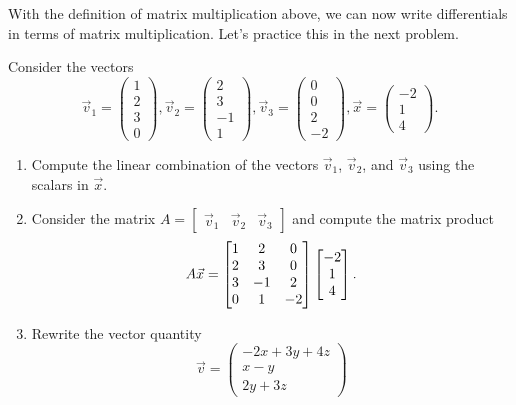 With the definition of matrix multiplication above, we can now write differentials in terms of matrix multiplication. Let's practice this in the next problem.
\begin{problem}
Consider the vectors 
$$
\vec v_1 = 
\begin{pmatrix}
 1\\2\\3\\0
\end{pmatrix},
 \vec v_2 = 
\begin{pmatrix}
 2\\3\\-1\\1
\end{pmatrix},
\vec v_3 = 
\begin{pmatrix}
 0\\0\\2\\-2
\end{pmatrix},
\vec x = 
\begin{pmatrix}
 -2\\1\\4
\end{pmatrix}.
$$
\begin{enumerate}
 \item Compute the linear combination of the vectors $\vec v_1$, $\vec v_2$, and $\vec v_3$ using the scalars in $\vec x$. 
\item Consider the matrix 
$A =
\begin{bmatrix}
 \vec v_1&
 \vec v_2&
 \vec v_3
\end{bmatrix}
$ 
and compute the matrix product 
$$
A\vec x = 
\begin{bmatrix}
 \nvec{1\\2\\3\\0}&
 \nvec{2\\3\\-1\\1}&
 \nvec{0\\0\\2\\-2}
\end{bmatrix}
\begin{bmatrix}
 -2\\1\\4
\end{bmatrix}.
$$
 \item 
Rewrite the vector quantity
$$\vec v = 
\begin{pmatrix}
 -2x+3y+4z\\x-y\\2y+3z

\end{pmatrix}$$
\end{enumerate}
\end{problem}
